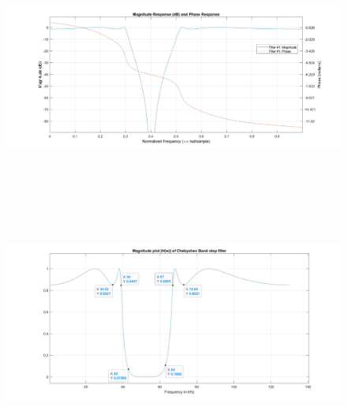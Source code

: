 \documentclass[12pt]{article}
\begin{document}
	\begin{figure}[H]
		\centering
		\includegraphics[width = 18cm, height = 10cm]{Filter2MagPhase.jpg}
	\end{figure}
	\begin{figure}[H]
		\centering
		\includegraphics[width = 18cm, trim=0cm 0cm 0cm 0cm, clip]{Filter2DBSF.jpg}
	\end{figure}
	
\color{cyan}
\end{document}
